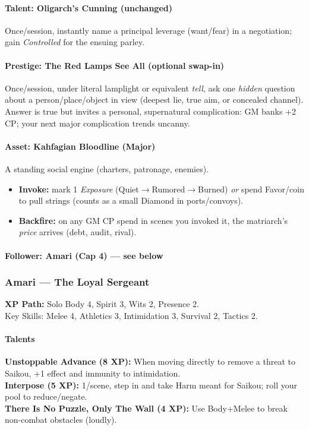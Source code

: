 \paragraph{Talent: Oligarch’s Cunning (unchanged)}
Once/session, instantly name a principal leverage (want/fear) in a negotiation; gain \emph{Controlled} for the ensuing parley.

\paragraph{Prestige: The Red Lamps See All (optional swap-in)}
Once/session, under literal lamplight or equivalent \emph{tell}, ask one \emph{hidden} question about a person/place/object in view (deepest lie, true aim, or concealed channel). Answer is true but invites a personal, supernatural complication: GM banks +2 CP; your next major complication trends uncanny.

\paragraph{Asset: Kahfagian Bloodline (Major)}
A standing social engine (charters, patronage, enemies).
\begin{itemize}
  \item \textbf{Invoke:} mark 1 \emph{Exposure} (Quiet$\to$Rumored$\to$Burned) \emph{or} spend Favor/coin to pull strings (counts as a small Diamond in ports/convoys).
  \item \textbf{Backfire:} on any GM CP spend in scenes you invoked it, the matriarch’s \emph{price} arrives (debt, audit, rival).
\end{itemize}

\paragraph{Follower: Amari (Cap 4) — see below}

\subsubsection{Amari — The Loyal Sergeant}
\textbf{XP Path:} Solo \quad
Body 4, Spirit 3, Wits 2, Presence 2.\\
Key Skills: Melee 4, Athletics 3, Intimidation 3, Survival 2, Tactics 2.

\paragraph{Talents}
\textbf{Unstoppable Advance (8 XP):} When moving directly to remove a threat to Saikou, +1 effect and immunity to intimidation.\\
\textbf{Interpose (5 XP):} 1/scene, step in and take Harm meant for Saikou; roll your pool to reduce/negate.\\
\textbf{There Is No Puzzle, Only The Wall (4 XP):} Use Body+Melee to break non-combat obstacles (loudly).

